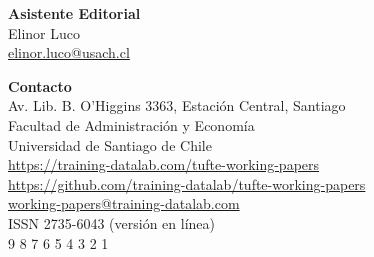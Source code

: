 \documentclass[a4paper]{tufte-book} %
\begin{document}
\begin{fullwidth}
{\noindent \bfseries Asistente Editorial}\\
{\noindent Elinor Luco}\\
{\noindent {\Large \Letter} \href{mailto:elinor.luco@usach.cl}{elinor.luco@usach.cl}}

{\noindent \bfseries Contacto}\\
{\noindent Av. Lib. B. O'Higgins 3363, Estación Central, Santiago}\\
{\noindent Facultad de Administración y Economía}\\
{\noindent Universidad de Santiago de Chile}\\
{\noindent {\Large \faHome} \href{https://training-datalab.com/tufte-working-papers/}{https://training-datalab.com/tufte-working-papers}}\\
{\noindent {\Large \faGithub} \href{https://github.com/training-datalab/tufte-working-papers}{https://github.com/training-datalab/tufte-working-papers}}\\
{\noindent {\Large \Letter} \href{mailto:working-papers@training-datalab.com}{working-papers@training-datalab.com}}\\

{\noindent ISSN 2735-6043 {\footnotesize (versi\'on en l\'inea)}}\\

{\footnotesize {} \hspace{1mm} 9 \hspace{1mm} \hspace{1mm} 8 \hspace{1mm} 7 \hspace{1mm} 6 \hspace{1mm} 5 \hspace{1mm} 4 \hspace{1mm} 3 \hspace{1mm} 2 \hspace{1mm} 1}
\end{fullwidth}
\end{document}
